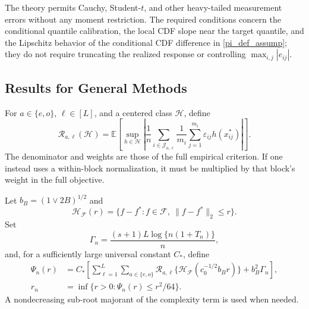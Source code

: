 \documentclass[twoside,11pt]{article}
\newenvironment{revision}{\color{revisionred}}{}
\begin{document}
\begin{example}\label{exp_tail}
\begin{revision}
The theory permits Cauchy, Student-$t$, and other heavy-tailed measurement errors without any moment restriction. The required conditions concern the conditional quantile calibration, the local CDF slope near the target quantile, and the Lipschitz behavior of the conditional CDF difference in \eqref{pi_def_assump}; they do not require truncating the realized response or controlling $\max_{i,j}|e_{ij}|$.
\end{revision}
\end{example}

\subsection{Results for General Methods}

\begin{revision}
For $a\in\{e,o\}$, $\ell\in[L]$, and a centered class $\mathcal H$, define
\begin{equation}
 \mathcal R_{a,\ell}(\mathcal H)=
 \mathbb E\left[\sup_{h\in\mathcal H}
 \left|\frac1n\sum_{i\in\mathcal J_{a,\ell}}\frac1{m_i}
 \sum_{j=1}^{m_i}\varepsilon_{ij}h(x_{ij}^*)\right|\right]. \label{rademacher_def_blocks}
\end{equation}
The denominator and weights are those of the full empirical criterion. If one instead uses a within-block normalization, it must be multiplied by that block's weight in the full objective.

Let $b_B=(1\vee2B)^{1/2}$ and
\[
 \mathcal H_{\mathcal F}(r)=\{f-f^*:f\in\mathcal F,\ \|f-f^*\|_2\le r\}.
\]
Set
\begin{equation}
 \Gamma_n=\frac{(s+1)L\log\{n(1+T_n)\}}{n},                  \label{eq:Gamma_n_full}
\end{equation}
and, for a sufficiently large universal constant $C_*$, define
\begin{align}
 \Psi_n(r)&=C_*\left[
 \sum_{\ell=1}^L\sum_{a\in\{e,o\}}
 \mathcal R_{a,\ell}\{\mathcal H_{\mathcal F}(c_0^{-1/2}b_Br)\}
 +b_B^2\Gamma_n\right],\nonumber\\
 r_n&=\inf\{r>0:\Psi_n(r)\le r^2/64\}.                      \label{eq:critical_radius}
\end{align}
A nondecreasing sub-root majorant of the complexity term is used when needed.
\end{revision}
\end{document}
